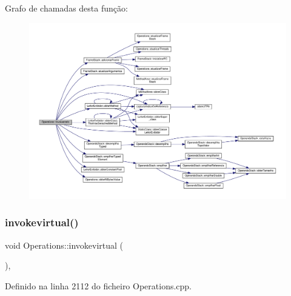 Grafo de chamadas desta função\+:
\nopagebreak
\begin{figure}[H]
\begin{center}
\leavevmode
\includegraphics[width=350pt]{classOperations_a562d8c9cc5975de2ee6d1a95e1969724_cgraph}
\end{center}
\end{figure}
\mbox{\label{classOperations_acf53d7e184b8828702b4d5036ef0a7a9}} 
\subsubsection{\texorpdfstring{invokevirtual()}{invokevirtual()}}
{\footnotesize\ttfamily void Operations\+::invokevirtual (\begin{DoxyParamCaption}{ }\end{DoxyParamCaption})\hspace{0.3cm}{\ttfamily [static]}, {\ttfamily [private]}}



Definido na linha 2112 do ficheiro Operations.\+cpp.



